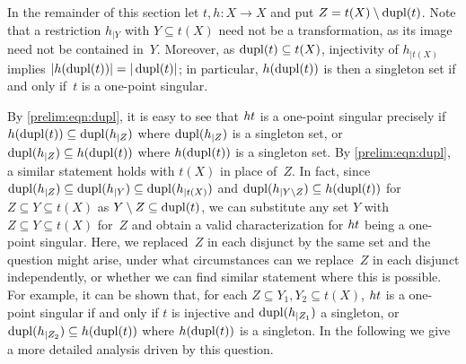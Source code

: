 In the remainder of this section let $t,h \colon X \to X$ and put
$Z = t(X) \setminus \dupl{t}$.
Note that a restriction $h_{|Y}$ with $Y \subseteq t(X)$ need not be a
transformation, as its image need not be contained in~$Y$.
Moreover, as $\dupl{t} \subseteq t(X)$, injectivity of $h_{|t(X)}$ implies
$|h(\dupl{t})| = |\dupl{t}|$; in particular, $h(\dupl{t})$ is then a singleton set
if and only if~$t$ is a one-point singular.

By \cref{prelim:eqn:dupl}, it is easy to see that $\concat{t}{h}$
is a one-point singular precisely if 
$h(\dupl{t}) \subseteq \dupl{h_{|Z}}$
where $\dupl{h_{|Z}}$ is a singleton set, or
$\dupl{h_{|Z}} \subseteq h(\dupl{t})$ where $h(\dupl{t})$
is a singleton set.
By \cref{prelim:eqn:dupl}, a similar statement holds with $t(X)$ in place of~$Z$. 
In fact, since 
$\dupl{h_{|Z}} \subseteq \dupl{h_{|Y}} \subseteq \dupl{h_{|t(X)}}$
and $\dupl{h_{|Y \setminus Z}} \subseteq h(\dupl{t})$
for $Z \subseteq Y \subseteq t(X)$ as $Y \setminus Z \subseteq \dupl{t}$,
we can substitute any set $Y$ with $Z \subseteq Y \subseteq t(X)$
for~$Z$ and obtain a valid characterization
for $\concat{t}{h}$ being a one-point singular.
Here, we replaced~$Z$ in each disjunct by the same set
and the question might arise, under what circumstances
can we replace~$Z$ in each disjunct independently,
or whether we can find similar statement where this is possible.
For example, it can be shown that, for each $Z \subseteq Y_1, Y_2 \subseteq t(X)$,
$\concat{t}{h}$ is a one-point singular if and only if
$t$ is injective and $\dupl{h_{|Z_1}}$ a singleton,
or $\dupl{h_{|Z_2}} \subseteq h(\dupl{t})$ where $h(\dupl{t})$ is a singleton.
In the following we give a more detailed analysis driven by this question.

